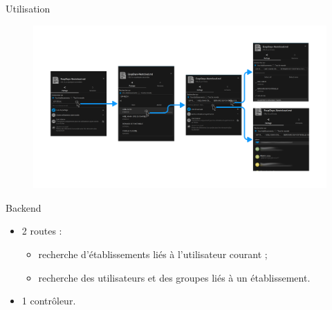\begin{frame}[fragile]{\sub}{Utilisation}
\vspace{-20pt}
\begin{figure}
\includegraphics[width=\textwidth]{Fonctionnement-fork-files_sharing.pdf}
\end{figure}
\end{frame}

\begin{frame}[fragile]{\sub}{Backend}
\begin{itemize}
	\item 2 routes :
		\begin{itemize}
			\item recherche d'établissements liés à l'utilisateur courant ;
			\item recherche des utilisateurs et des groupes liés à un établissement.
		\end{itemize}

	\item 1 contrôleur.
\end{itemize}

\end{frame}



